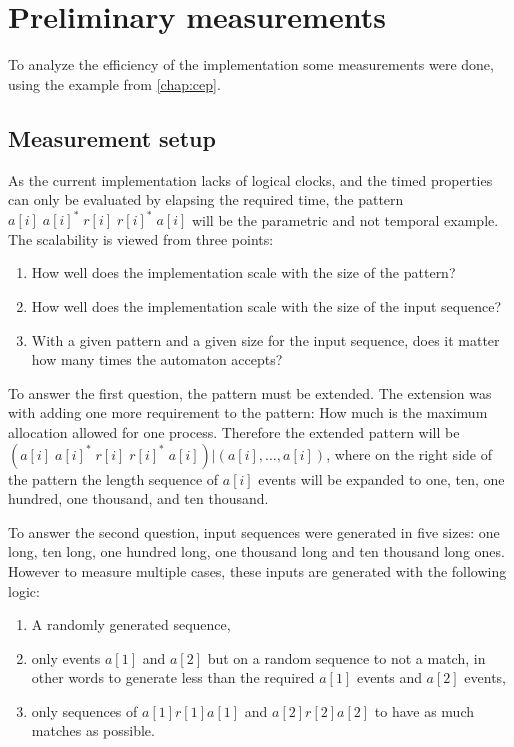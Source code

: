 	\section{Preliminary measurements}
	To analyze the efficiency of the implementation some measurements were done, using the example from \cref{chap:cep}.
	
	\subsection{Measurement setup}
	As the current implementation lacks of logical clocks, and the timed properties can only be evaluated by elapsing the required time, the pattern $a[i] \; a[i]^\ast \; r[i] \; r[i]^\ast \; a[i]$ will be the parametric and not temporal example.
	The scalability is viewed from three points:
	
	\begin{enumerate}
		\item How well does the implementation scale with the size of the pattern?
		\item How well does the implementation scale with the size of the input sequence?
		\item With a given pattern and a given size for the input sequence, does it matter how many times the automaton accepts?
	\end{enumerate}
	
	To answer the first question, the pattern must be extended. The extension was with adding one more requirement to the pattern: How much is the maximum allocation allowed for one process. Therefore the extended pattern will be $ ( a[i] \; a[i]^\ast \; r[i] \; r[i]^\ast \; a[i] ) | (a[i],\dots,a[i])$, where on the right side of the pattern the length sequence of $a[i]$ events will be expanded to one, ten, one hundred, one thousand, and ten thousand.
	
	To answer the second question, input sequences were generated in five sizes: one long, ten long, one hundred long, one thousand long and ten thousand long ones.
	However to measure multiple cases, these inputs are generated with the following logic:
	\begin{enumerate}
		\item A randomly generated sequence,
		\item only events $a[1]$ and $a[2]$ but on a random sequence to not a match, in other words to generate less than the required $a[1]$ events and $a[2]$ events,
		\item only sequences of $a[1] r[1] a[1]$ and $a[2] r[2] a[2]$ to have as much matches as possible.
	\end{enumerate}

